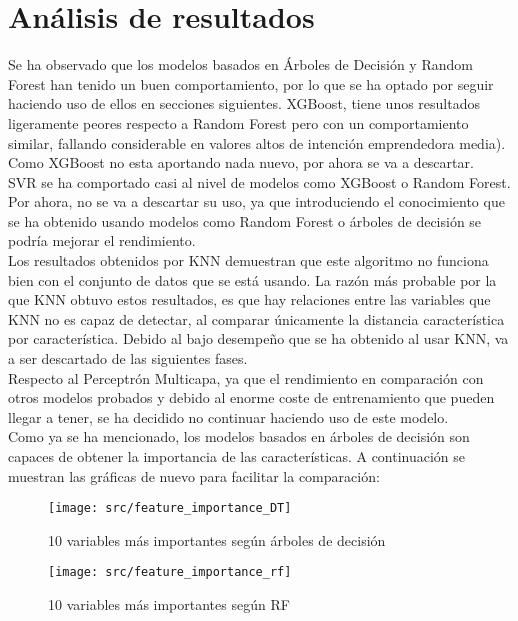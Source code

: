 \section{Análisis de resultados}
Se ha observado que los modelos basados en Árboles de Decisión y Random Forest han tenido un buen comportamiento, por lo que se ha optado por seguir haciendo uso de ellos en secciones siguientes. XGBoost, tiene unos resultados ligeramente peores respecto a Random Forest pero con un comportamiento similar, fallando considerable en valores altos de intención emprendedora media). Como XGBoost no esta aportando nada nuevo, por ahora se va a descartar.\\
\linebreak
SVR se ha comportado casi al nivel de modelos como XGBoost o Random Forest. Por ahora, no se va a descartar su uso, ya que introduciendo el conocimiento que se ha obtenido usando modelos como Random Forest o árboles de decisión se podría mejorar el rendimiento.\\
\linebreak
Los resultados obtenidos por  KNN demuestran que este algoritmo no funciona bien con el conjunto de datos que se está usando. La razón más probable por la que KNN obtuvo estos resultados, es que hay relaciones entre las variables que KNN no es capaz de detectar, al comparar únicamente la distancia característica por característica. Debido al bajo desempeño que se ha obtenido al usar KNN, va a ser descartado de las siguientes fases.\\
\linebreak
Respecto al Perceptrón Multicapa, ya que el rendimiento en comparación con otros modelos probados y debido al enorme coste de entrenamiento que pueden llegar a tener, se ha decidido no continuar haciendo uso de este modelo.\\
\clearpage
Como ya se ha mencionado, los modelos basados en árboles de decisión son capaces de obtener la importancia de las características. A continuación se muestran las gráficas de nuevo para facilitar la comparación:
\begin{figure}[H]
	\centering
	\texttt{[image: src/feature\_importance\_DT]}
	\caption{10 variables más importantes según árboles de decisión}
	\label{fig:feature_dtree2}
\end{figure}
\begin{figure}[H]
	\centering
	\texttt{[image: src/feature\_importance\_rf]}
	\caption{10 variables más importantes según RF}
	\label{fig:feature_rf2}
\end{figure}
